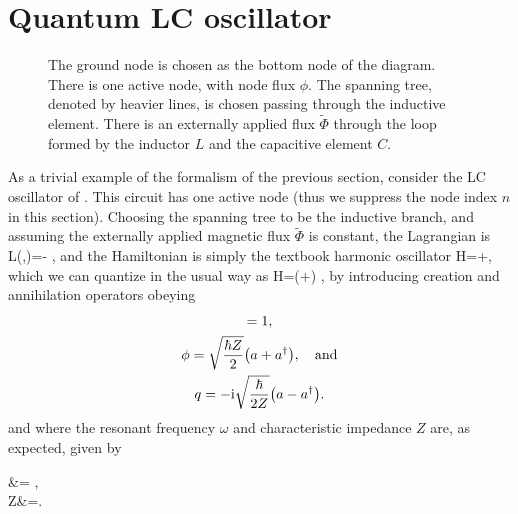 \section{Quantum LC oscillator}\label{sec:lcosc}%
\begin{figure}
 \centering
 \caption[The LC oscillator]{ The ground node is chosen as the bottom node of the diagram. There is one active node, with node flux $\phi$. The spanning tree, denoted by heavier lines, is chosen passing through the inductive element. There is an externally applied flux $\tilde\Phi$ through the loop formed by the inductor $L$ and the capacitive element $C$.\label{fig:figLC}}
\end{figure}%
As a trivial example of the formalism of the previous section, consider the LC oscillator of . This circuit has one active node (thus we suppress the node index $n$ in this section). Choosing the spanning tree to be the inductive branch, and assuming the externally applied magnetic flux $\tilde\Phi$ is constant, the Lagrangian is
\be L(\phi,\dot\phi)=- ,\ee
and the Hamiltonian is simply the textbook harmonic oscillator
\be \label{eq:lcosc} H=+, \ee
which we can quantize in the usual way as
\be H=\hbar\omega\left(\aop\dg\aop+\right) , \ee
by introducing creation and annihilation operators obeying
\begin{gather}
    [\aop,\aop\dg]=1 ,\label{eq:LCadga}\\
    \phi=\sqrt{\frac{\hbar Z}{2}}\bigl(\aop+\aop\dg\bigr),\quad\text{and} \\
    q=-\rmi\sqrt{\frac{\hbar}{2Z}}\bigl(\aop-\aop\dg\bigr).
\end{gather}%
%
and where the resonant frequency $\omega$ and characteristic impedance $Z$ are, as expected, given by%
%
\begin{subal}{\label{eq:freqimp}}
     \omega &= ,\quad{} \\
     Z&=. \label{eq:charimp}
\end{subal}

